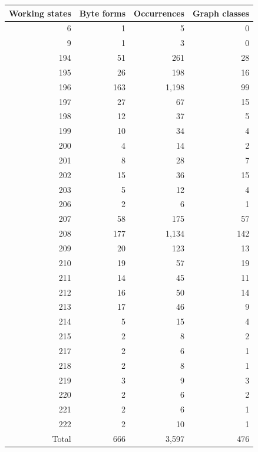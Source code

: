 \begin{longtable}{rrrr}
\toprule
Working states & Byte forms & Occurrences & Graph classes\\
\midrule\endhead
6 & 1 & 5 & 0\\
9 & 1 & 3 & 0\\
194 & 51 & 261 & 28\\
195 & 26 & 198 & 16\\
196 & 163 & 1,198 & 99\\
197 & 27 & 67 & 15\\
198 & 12 & 37 & 5\\
199 & 10 & 34 & 4\\
200 & 4 & 14 & 2\\
201 & 8 & 28 & 7\\
202 & 15 & 36 & 15\\
203 & 5 & 12 & 4\\
206 & 2 & 6 & 1\\
207 & 58 & 175 & 57\\
208 & 177 & 1,134 & 142\\
209 & 20 & 123 & 13\\
210 & 19 & 57 & 19\\
211 & 14 & 45 & 11\\
212 & 16 & 50 & 14\\
213 & 17 & 46 & 9\\
214 & 5 & 15 & 4\\
215 & 2 & 8 & 2\\
217 & 2 & 6 & 1\\
218 & 2 & 8 & 1\\
219 & 3 & 9 & 3\\
220 & 2 & 6 & 2\\
221 & 2 & 6 & 1\\
222 & 2 & 10 & 1\\
\midrule
Total & 666 & 3,597 & 476\\
\bottomrule
\end{longtable}
